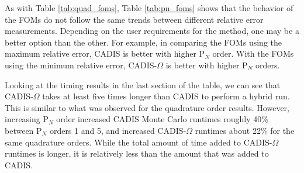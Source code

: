 As with Table \ref{tab:quad_foms}, Table \ref{tab:pn_foms} shows that the
behavior of the FOMs do not follow the same trends between different relative
error measurements. Depending on the user requirements for the method, one may
be a better option than the other. For example, in comparing the FOMs using the
maximum relative error, CADIS is better with higher P$_N$ order. With the FOMs
using the minimum relative error, CADIS-$\Omega$ is better with higher P$_N$
orders.

Looking at the timing results in the last
section of the table, we can see that CADIS-$\Omega$ takes at least five times
longer than CADIS to perform a hybrid run. This is similar to what was observed
for the quadrature order results. However, increasing P$_N$ order increased
CADIS Monte Carlo runtimes roughly 40\% between P$_N$ orders 1 and 5, and
increased CADIS-$\Omega$ runtimes about 22\% for the same quadrature orders.
While the total amount of time added to CADIS-$\Omega$ runtimes is longer, it is
relatively less than the amount that was added to CADIS.


